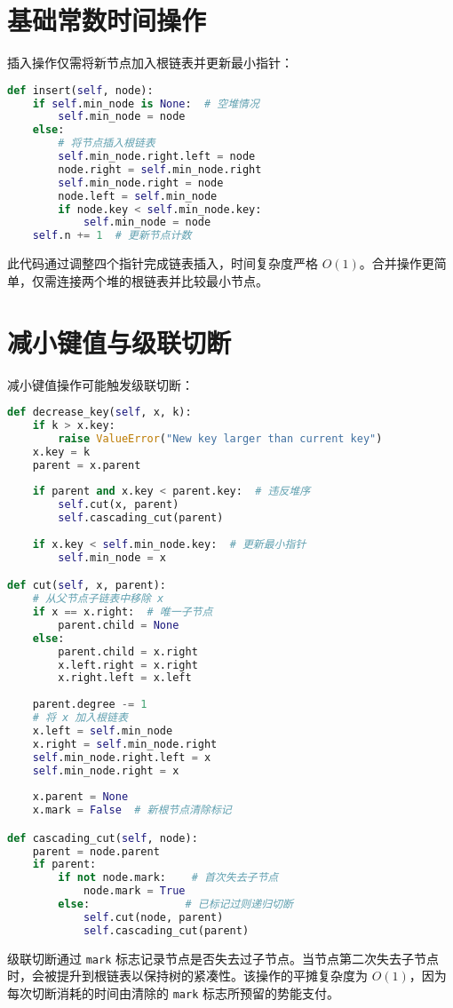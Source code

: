 \section{基础常数时间操作}
插入操作仅需将新节点加入根链表并更新最小指针：\par
\begin{lstlisting}[language=python]
def insert(self, node):
    if self.min_node is None:  # 空堆情况
        self.min_node = node
    else:
        # 将节点插入根链表
        self.min_node.right.left = node
        node.right = self.min_node.right
        self.min_node.right = node
        node.left = self.min_node
        if node.key < self.min_node.key:
            self.min_node = node
    self.n += 1  # 更新节点计数
\end{lstlisting}
此代码通过调整四个指针完成链表插入，时间复杂度严格 $O(1)$。合并操作更简单，仅需连接两个堆的根链表并比较最小节点。\par
\section{减小键值与级联切断}
减小键值操作可能触发级联切断：\par
\begin{lstlisting}[language=python]
def decrease_key(self, x, k):
    if k > x.key: 
        raise ValueError("New key larger than current key")
    x.key = k
    parent = x.parent
    
    if parent and x.key < parent.key:  # 违反堆序
        self.cut(x, parent)
        self.cascading_cut(parent)
    
    if x.key < self.min_node.key:  # 更新最小指针
        self.min_node = x

def cut(self, x, parent):
    # 从父节点子链表中移除 x
    if x == x.right:  # 唯一子节点
        parent.child = None
    else:
        parent.child = x.right
        x.left.right = x.right
        x.right.left = x.left
    
    parent.degree -= 1
    # 将 x 加入根链表
    x.left = self.min_node
    x.right = self.min_node.right
    self.min_node.right.left = x
    self.min_node.right = x
    
    x.parent = None
    x.mark = False  # 新根节点清除标记

def cascading_cut(self, node):
    parent = node.parent
    if parent:
        if not node.mark:    # 首次失去子节点
            node.mark = True
        else:               # 已标记过则递归切断
            self.cut(node, parent)
            self.cascading_cut(parent)
\end{lstlisting}
级联切断通过 \texttt{mark} 标志记录节点是否失去过子节点。当节点第二次失去子节点时，会被提升到根链表以保持树的紧凑性。该操作的平摊复杂度为 $O(1)$，因为每次切断消耗的时间由清除的 \texttt{mark} 标志所预留的势能支付。\par
